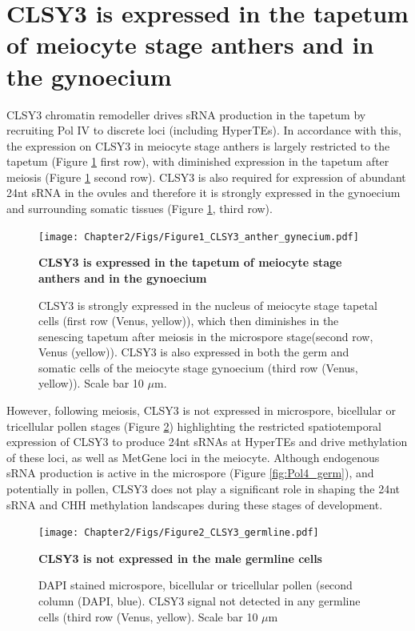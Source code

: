 \section{CLSY3 is expressed in the tapetum of meiocyte stage anthers and in the gynoecium}

CLSY3 chromatin remodeller drives sRNA production in the tapetum \citep{RN187} by recruiting Pol IV to discrete loci (including HyperTEs)\citep{RN23}. In accordance with this, the expression on CLSY3 in meiocyte stage anthers is largely restricted to the tapetum (Figure \ref{fig:CLSY3_anther} first row), with diminished expression in the tapetum after meiosis (Figure \ref{fig:CLSY3_anther} second row). CLSY3 is also required for expression of abundant 24nt sRNA in the ovules and therefore it is strongly expressed in the gynoecium and surrounding somatic tissues (Figure \ref{fig:CLSY3_anther}, third row).

\begin{figure}[htbp!] 
\centering    
    \texttt{[image: Chapter2/Figs/Figure1\_CLSY3\_anther\_gynecium.pdf]}
\caption{\textbf{CLSY3 is expressed in the tapetum of meiocyte stage anthers and in the gynoecium}}
\label{fig:CLSY3_anther}
\captionsetup{font=small}
    \caption*{CLSY3 is strongly expressed in the nucleus of meiocyte stage tapetal cells (first row (Venus, yellow)), which then diminishes in the senescing tapetum after meiosis in the microspore stage(second row, Venus (yellow)). CLSY3 is also expressed in both the germ and somatic cells of the meiocyte stage gynoecium (third row (Venus, yellow)). Scale bar 10 $\mu$m.}
\end{figure}

However, following meiosis, CLSY3 is not expressed in microspore, bicellular or tricellular pollen stages (Figure \ref{fig:CLSY3_germ}) highlighting the restricted spatiotemporal expression of CLSY3 to produce 24nt sRNAs at HyperTEs and drive methylation of these loci, as well as MetGene loci in the meiocyte. Although endogenous sRNA production is active in the microspore (Figure \ref{fig:Pol4_germ}), and potentially in pollen, CLSY3 does not play a significant role in shaping the 24nt sRNA and CHH methylation landscapes during these stages of development.

\begin{figure}[htbp!] 
\centering    
    \texttt{[image: Chapter2/Figs/Figure2\_CLSY3\_germline.pdf]}
\caption{\textbf{CLSY3 is not expressed in the male germline cells}}
\label{fig:CLSY3_germ}
\captionsetup{font=small}
    \caption*{DAPI stained microspore, bicellular or tricellular pollen (second column (DAPI, blue). CLSY3 signal not detected in any germline cells (third row (Venus, yellow). Scale bar 10 $\mu$m}
\end{figure}

